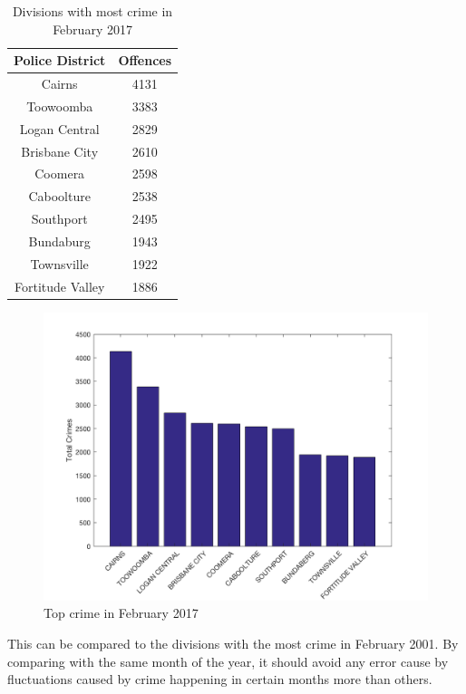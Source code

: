 \documentclass[]{article}
\begin{document}
\begin{table}[H]
    \caption{Divisions with most crime in February 2017}
    \centering
    \begin{tabular}{|c|c|}
        \hline
        Police District & Offences \\
        \hline
        Cairns & 4131 \\
        Toowoomba & 3383 \\
        Logan Central & 2829 \\
        Brisbane City & 2610 \\
        Coomera & 2598 \\
        Caboolture & 2538 \\
        Southport & 2495 \\
        Bundaburg & 1943 \\
        Townsville & 1922 \\
        Fortitude Valley & 1886 \\
        \hline
    \end{tabular}
\end{table}

\begin{figure}[H]
    \caption{Top crime in February 2017}
    \centering
    \includegraphics[width=\linewidth]{../images/top_crime_2017}
\end{figure}

This can be compared to the divisions with the most crime in February 2001. By comparing with the same month of the year, it should avoid any error cause by fluctuations caused by crime happening in certain months more than others.
\end{document}
